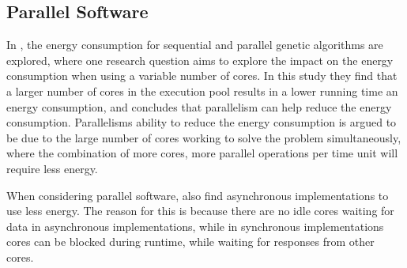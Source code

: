 \subsection{Parallel Software}

In \cite{abdelhafez2019}, the energy consumption for sequential and parallel genetic algorithms are explored, where one research question aims to explore the impact on the energy consumption when using a variable number of cores. In this study they find that a larger number of cores in the execution pool results in a lower running time an energy consumption, and concludes that parallelism can help reduce the energy consumption. Parallelisms ability to reduce the energy consumption is argued to be due to the large number of cores working to solve the problem simultaneously, where the combination of more cores, more parallel operations per time unit will require less energy.

When considering parallel software, \cite{abdelhafez2019} also find asynchronous implementations to use less energy. The reason for this is because there are no idle cores waiting for data in asynchronous implementations, while in synchronous implementations cores can be blocked during runtime, while waiting for responses from other cores. 

